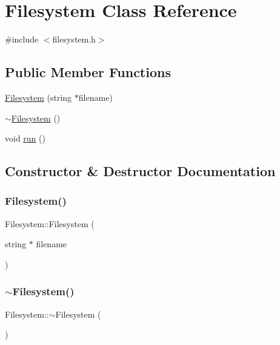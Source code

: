 \hypertarget{class_filesystem}{}\section{Filesystem Class Reference}
\label{class_filesystem}


{\ttfamily \#include $<$filesystem.\+h$>$}

\subsection*{Public Member Functions}
\begin{DoxyCompactItemize}
\item 
\hyperlink{class_filesystem_aac89cbe467cc517e80049e0277812040}{Filesystem} (string $\ast$filename)
\item 
\hyperlink{class_filesystem_a8d4d73d3d4e56fd6792bdb83f6c5dfd8}{$\sim$\+Filesystem} ()
\item 
void \hyperlink{class_filesystem_a373c34da491ec8d269cbc18d52a1ad79}{run} ()
\end{DoxyCompactItemize}


\subsection{Constructor \& Destructor Documentation}
\mbox{\label{class_filesystem_aac89cbe467cc517e80049e0277812040}} 
\subsubsection{\texorpdfstring{Filesystem()}{Filesystem()}}
{\footnotesize\ttfamily Filesystem\+::\+Filesystem (\begin{DoxyParamCaption}\item[{string $\ast$}]{filename }\end{DoxyParamCaption})\hspace{0.3cm}{\ttfamily [inline]}}

\mbox{\label{class_filesystem_a8d4d73d3d4e56fd6792bdb83f6c5dfd8}} 
\subsubsection{\texorpdfstring{$\sim$\+Filesystem()}{~Filesystem()}}
{\footnotesize\ttfamily Filesystem\+::$\sim$\+Filesystem (\begin{DoxyParamCaption}{ }\end{DoxyParamCaption})\hspace{0.3cm}{\ttfamily [inline]}}



